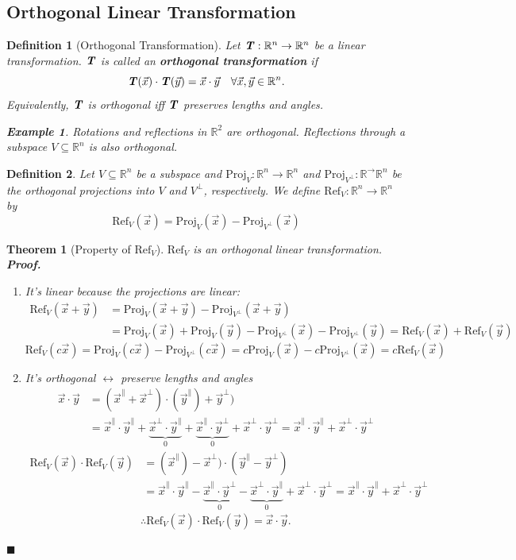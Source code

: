 \documentclass[12pt, a4paper]{article}
\newtheorem{thm}{Theorem}[subsection]
\newtheorem{df}{Definition}[subsection]
\newtheorem{eg}{Example}[subsection]
\newenvironment*{prf}{\indent\textbf{\textit{Proof. }}}{\hfill $\blacksquare$\par}
\def\R{{\mathbb{R}}}
\def\T{{\textbf{\emph{T}}}}
\def\Proj{\mathrm{Proj}}
\def\Ref{\mathrm{Ref}}
\def\vecx{\vec{x}}
\def\vecy{\vec{y}}
\begin{document}
\subsection{Orthogonal Linear Transformation}
\begin{df}[Orthogonal Transformation]
	Let $\T:\R^n\to\R^n$ be a linear transformation. $\T$ is called an \textbf{orthogonal transformation} if \[\T(\vecx)\cdot\T(\vecy)=\vecx\cdot\vecy\quad\forall\vecx,\vecy\in\R^n.\]	
	Equivalently, $\T$ is orthogonal \emph{iff} $\T$ preserves lengths and angles. 
	\begin{eg}
		Rotations and reflections in $\R^2$ are orthogonal. Reflections through a subspace $V\subseteq\R^n$ is also orthogonal. 	
	\end{eg}
\end{df}
\begin{df}
	Let $V\subseteq\R^n$ be a subspace and $\Proj_V:\R^n\to\R^n$ and $\Proj_{V^\perp}:\R^\to\R^n$ be the orthogonal projections into $V$ and $V^\perp$, respectively. We define $\Ref_V:\R^n\to\R^n$ by \[\Ref_V(\vecx)=\Proj_V(\vecx)-\Proj_{V^\perp}(\vecx)\]	
\end{df}
\begin{thm}[Property of $\Ref_V$]
	$\Ref_V$ is an orthogonal linear transformation. \\
	\begin{prf}
		\begin{enumerate}
			\item It's linear because the projections are linear: 
			$$\begin{aligned}
				\Ref_V(\vecx+\vecy)&=\Proj_V(\vecx+\vecy)-\Proj_{V^\perp}(\vecx+\vecy)\\
				&=\Proj_V(\vecx)+\Proj_V(\vecy)-\Proj_{V^\perp}(\vecx)-\Proj_{V^\perp}(\vecy)=\Ref_V(\vecx)+\Ref_V(\vecy)
			\end{aligned}$$	
			\[\Ref_V(c\vecx)=\Proj_V(c\vecx)-\Proj_{V^\perp}(c\vecx)=c\Proj_V(\vecx)-c\Proj_{V^\perp}(\vecx)=c\Ref_V(\vecx)\]
			\item It's orthogonal $\longleftrightarrow$ preserve lengths and angles
			$$\begin{aligned}
				\vecx\cdot\vecy&=(\vecx^\parallel+\vecx^\perp)\cdot(\vecy^\parallel)+\vecy^\perp)\\
				&=\vecx^\parallel\cdot\vecy^\parallel+\underbrace{\vecx^\perp\cdot\vecy^\parallel}_{0}+\underbrace{\vecx^\parallel\cdot\vecy^\perp}_{0}+\vecx^\perp\cdot\vecy^\perp=\vecx^\parallel\cdot\vecy^\parallel+\vecx^\perp\cdot\vecy^\perp
			\end{aligned}$$
			$$\begin{aligned}
				\Ref_V(\vecx)\cdot\Ref_V(\vecy)&=(\vecx^\parallel)-\vecx^\perp)\cdot(\vecy^\parallel-\vecy^\perp)\\
				&=\vecx^\parallel\cdot\vecy^\parallel-\underbrace{\vecx^\parallel\cdot\vecy^\perp}_{0}-\underbrace{\vecx^\perp\cdot\vecy^\parallel}_{0}+\vecx^\perp\cdot\vecy^\perp=\vecx^\parallel\cdot\vecy^\parallel+\vecx^\perp\cdot\vecy^\perp
			\end{aligned}$$
			\[\therefore\Ref_V(\vecx)\cdot\Ref_V(\vecy)=\vecx\cdot\vecy.\]
		\end{enumerate}
	\end{prf}
\end{thm}
\end{document}

